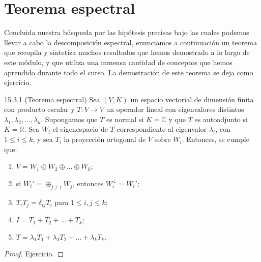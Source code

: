 \documentclass[notasLineal]{subfiles}
\begin{document}
\section{Teorema espectral}\label{Sec: Teorema espectral}

Concluida nuestra búsqueda por las hipótesis precisas bajo las cuales podemos llevar a cabo la descomposición espectral, enunciamos a continuación un teorema que recopila y sintetiza muchos resultados que hemos demostrado a lo largo de este módulo, y que utiliza una inmensa cantidad de conceptos que hemos aprendido durante todo el curso. La demostración de este teorema se deja como ejercicio.

\begin{Teo} {15.3.1 (Teorema espectral)}
Sea $(V,K)$ un espacio vectorial de dimensión finita con producto escalar y $T:V\to V$ un operador lineal con eigenvalores distintos $\lambda_1,\lambda_2,...,\lambda_k$. Supongamos que $T$ es normal si $K=\mathbb{C}$ y que $T$ es autoadjunto si $K=\mathbb{R}$. Sea $W_i$ el eigenespacio de $T$ correspondiente al eigenvalor $\lambda_i$, con $1\leq i\leq k$, y sea $T_i$ la proyección ortogonal de $V$ sobre $W_i$. Entonces, se cumple que:
\begin{enumerate}[label=\alph*)]
    \item $V = W_1 \oplus W_2 \oplus ... \oplus W_k$;
    \item si $W_i'=\oplus_{j\neq i}W_j$, entonces $W_i^\perp=W_i'$;
    \item $T_i T_j = \delta_{ij}T_i$ para $1\leq i,j\leq k$;
    \item $I = T_1+T_2+...+T_k$;
    \item $T = \lambda_1 T_1 + \lambda_2 T_2 + ... + \lambda_k T_k$.
\end{enumerate}

\begin{proof}
    
    Ejercicio.

\end{proof}

\end{Teo}
\end{document}
